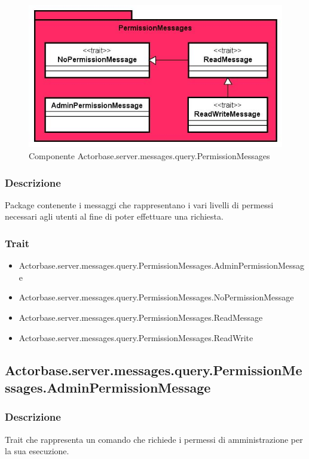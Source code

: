 \documentclass[a4paper]{article}
\begin{document}
			\begin{figure}[H]
				\centering
				\includegraphics[scale=0.70]{ST/Server/permissionMessagesLevel}
				\caption{Componente Actorbase.server.messages.query.PermissionMessages}
			\end{figure}
			
			\subsubsection{Descrizione}
				Package contenente i messaggi che rappresentano i vari livelli di permessi necessari agli utenti al fine di poter 
				effettuare una richiesta.
				
			\subsubsection{Trait}
				\begin{itemize}
					\item Actorbase.server.messages.query.PermissionMessages.AdminPermissionMessage
					\item Actorbase.server.messages.query.PermissionMessages.NoPermissionMessage
					\item Actorbase.server.messages.query.PermissionMessages.ReadMessage
					\item Actorbase.server.messages.query.PermissionMessages.ReadWrite
				\end{itemize}
				
		\subsection{Actorbase.server.messages.query.PermissionMessages.AdminPermissionMessage}
			\subsubsection{Descrizione}
				Trait che rappresenta un comando che richiede i permessi di amministrazione per la sua esecuzione.
				
\end{document}
